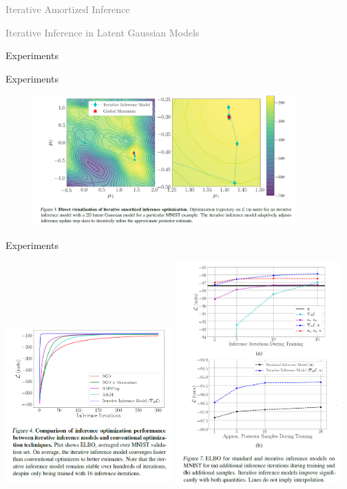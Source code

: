 \documentclass{beamer}		%
\newcommand{\light}[1]{\textcolor{gray}{#1}}
\begin{document}
\begin{frame}[noframenumbering]
\begin{itemize}
    \begin{LARGE}
    \item \light{Iterative Amortized Inference}
    \item \light{Iterative Inference in Latent Gaussian Models}
    \item Experiments
    \end{LARGE}
\end{itemize}
\end{frame}



\begin{frame}{Experiments}

\begin{figure}[t]
\includegraphics[width=0.9\textwidth]{figure13.png}
\label{fig1}
\end{figure}

\end{frame}



\begin{frame}{Experiments}


\includegraphics[width=0.48\textwidth, align=c]{figure14.png}
\includegraphics[width=0.48\textwidth, align=c]{figure15.png}

\end{frame}
\end{document}
